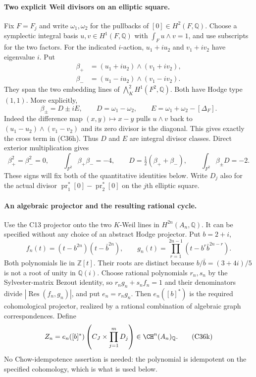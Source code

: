 \documentclass[11pt]{article}
\newcommand{\Q}{\mathbb Q}\newcommand{\C}{\mathbb C}\newcommand{\Z}{\mathbb Z}\newcommand{\R}{\mathbb R}\newcommand{\A}{\mathbb A}\newcommand{\OO}{\mathcal O}
\theoremstyle{definition}\newtheorem{definition}[theorem]{Definition}\newtheorem{remark}[theorem]{Remark}
\begin{document}
\paragraph{Two explicit Weil divisors on an elliptic square.}
Fix $F=F_j$ and write $\omega_1,\omega_2$ for the
pullbacks of $[0]\in H^2(F,\Q)$. Choose a symplectic
integral basis $u,v\in H^1(F,\Q)$ with
$\int_Fu\wedge v=1$, and use subscripts for the two
factors. For the indicated $i$-action,
$u_1+i u_2$ and $v_1+i v_2$ have eigenvalue $i$.
Put
\[
 \begin{split}
 \beta_+&=(u_1+i u_2)\wedge(v_1+i v_2),\\
 \beta_-&=(u_1-i u_2)\wedge(v_1-i v_2).
 \end{split}
 \tag{C36g}
\]
They span the two embedding lines of
$\bigwedge_K^2H^1(F^2,\Q)$. Both have Hodge type
$(1,1)$. More explicitly,
\[
 \beta_\pm=D\pm iE,\qquad
 D=\omega_1-\omega_2,\qquad
 E=\omega_1+\omega_2-[\Delta_F].
 \tag{C36h}
\]
Indeed the difference map $(x,y)\mapsto x-y$ pulls
$u\wedge v$ back to
$(u_1-u_2)\wedge(v_1-v_2)$ and its zero divisor is
the diagonal. This gives exactly the cross term in
(C36h). Thus $D$ and $E$ are integral divisor classes.
Direct exterior multiplication gives
\[
 \beta_+^2=\beta_-^2=0,\qquad
 \int_{F^2}\beta_+\beta_-=-4,\qquad
 D=\tfrac12(\beta_++\beta_-),\qquad
 \int_{F^2}\beta_\pm D=-2.
 \tag{C36i}
\]
These signs will fix both of the quantitative identities
below. Write $D_j$ also for the actual divisor
$\operatorname{pr}_1^*[0]-\operatorname{pr}_2^*[0]$
on the $j$th elliptic square.

\paragraph{An algebraic projector and the resulting rational cycle.}
Use the C13 projector onto the two $K$-Weil lines in
$H^{2n}(A_n,\Q)$. It can be specified without any
choice of an abstract Hodge projector. Put $b=2+i$,
\[
 f_n(t)=(t-b^{2n})(t-\bar b^{2n}),\qquad
 g_n(t)=\prod_{r=1}^{2n-1}
                       (t-b^r\bar b^{2n-r}).
 \tag{C36j}
\]
Both polynomials lie in $\Z[t]$. Their roots are
distinct because $b/\bar b=(3+4i)/5$ is not a root
of unity in $\Q(i)$. Choose rational polynomials
$r_n,s_n$ by the Sylvester-matrix Bezout identity, so
$r_ng_n+s_nf_n=1$ and their denominators divide
$|\operatorname{Res}(f_n,g_n)|$, and put
$e_n=r_ng_n$. Then $e_n([b]^*)$ is the required
cohomological projector, realized by a rational
combination of algebraic graph correspondences.
Define
\[
 Z_n=e_n([b]^*)\left(C_J\times
                              \prod_{j=1}^mD_j\right)
                  \in\CH^n(A_n)_\Q.
 \tag{C36k}
\]
No Chow-idempotence assertion is needed: the polynomial
is idempotent on the specified cohomology, which is
what is used below.
\end{document}
